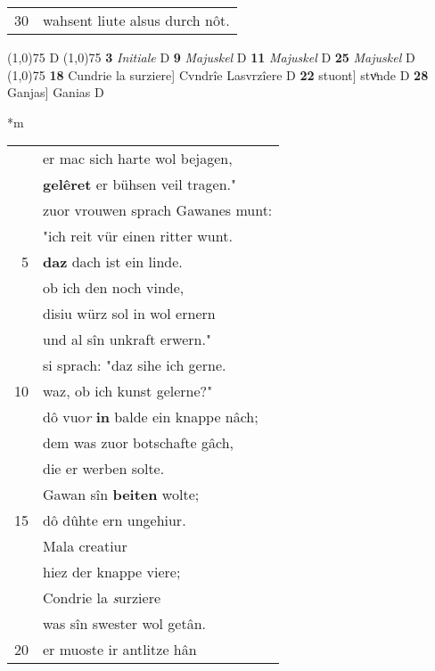 \documentclass[8pt,a4paper,notitlepage]{article}
\begin{document}
\begin{table}[ht]
\begin{minipage}[t]{0.5\linewidth}
\begin{tabular}{rl}
30 & wahsent liute alsus durch nôt.\\ 
\end{tabular}
\scriptsize
\line(1,0){75} \newline
D \newline
\line(1,0){75} \newline
\textbf{3} \textit{Initiale} D  \textbf{9} \textit{Majuskel} D  \textbf{11} \textit{Majuskel} D  \textbf{25} \textit{Majuskel} D  \newline
\line(1,0){75} \newline
\textbf{18} Cundrie la surziere] Cvndrîe Lasvrzîere D \textbf{22} stuont] stvͦnde D \textbf{28} Ganjas] Ganias D \newline
\end{minipage}
\hspace{0.5cm}
\begin{minipage}[t]{0.5\linewidth}
\small
\begin{center}*m
\end{center}
\begin{tabular}{rl}
 & er mac sich harte wol bejagen,\\ 
 & \textbf{gelêret} er bühsen veil tragen."\\ 
 & zuor vrouwen sprach Gawanes munt:\\ 
 & "ich reit vür einen ritter wunt.\\ 
5 & \textbf{daz} dach ist ein linde.\\ 
 & ob ich den noch vinde,\\ 
 & disiu würz sol in wol ernern\\ 
 & und al sîn unkraft erwern."\\ 
 & si sprach: "daz sihe ich gerne.\\ 
10 & waz, ob ich kunst gelerne?"\\ 
 & dô vuo\textit{r} \textbf{in} balde ein knappe nâch;\\ 
 & dem was zuor botschafte gâch,\\ 
 & die er werben solte.\\ 
 & Gawan sîn \textbf{beiten} wolte;\\ 
15 & dô dûhte ern ungehiur.\\ 
 & Mala creatiur\\ 
 & hiez der knappe viere;\\ 
 & Condrie la \textit{s}urziere\\ 
 & was sîn swester wol getân.\\ 
20 & er muoste ir antlitze hân\\ 

\end{tabular}
\end{minipage}
\end{table}
\end{document}
